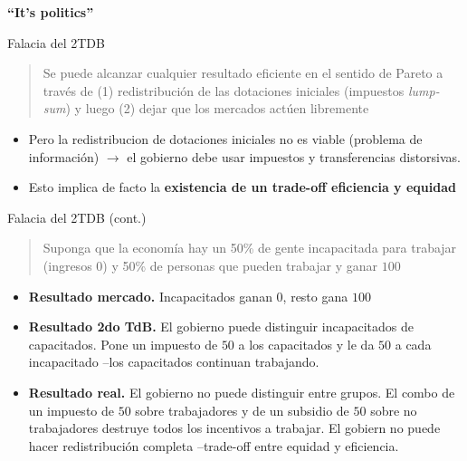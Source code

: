 \documentclass[
  ignorenonframetext,
]{beamer}
\providecommand{\tightlist}{%
  \setlength{\itemsep}{0pt}\setlength{\parskip}{0pt}}\usepackage{longtable,booktabs,array}
\begin{document}
\begin{frame}{\textbf{``It's politics''}}
\begin{block}{Falacia del 2TDB}
\protect\hypertarget{falacia-del-2tdb}{}
\begin{quote}
Se puede alcanzar cualquier resultado eficiente en el sentido de Pareto
a través de (1) redistribución de las dotaciones iniciales (impuestos
\emph{lump-sum}) y luego (2) dejar que los mercados actúen libremente
\end{quote}

\begin{itemize}
\tightlist
\item
  Pero la redistribucion de dotaciones iniciales no es viable (problema
  de información) \(\longrightarrow\) el gobierno debe usar impuestos y
  transferencias distorsivas.
\item
  Esto implica de facto la \textbf{existencia de un trade-off eficiencia
  y equidad}
\end{itemize}
\end{block}

\begin{block}{Falacia del 2TDB (cont.)}
\protect\hypertarget{falacia-del-2tdb-cont.}{}
\begin{quote}
Suponga que la economía hay un 50\% de gente incapacitada para trabajar
(ingresos \(0\)) y 50\% de personas que pueden trabajar y ganar \(100\)
\end{quote}

\begin{itemize}
\tightlist
\item
  \textbf{Resultado mercado.} Incapacitados ganan \(0\), resto gana
  \(100\)
\item
  \textbf{Resultado 2do TdB.} El gobierno puede distinguir incapacitados
  de capacitados. Pone un impuesto de \(50\) a los capacitados y le da
  \(50\) a cada incapacitado --los capacitados continuan trabajando.
\item
  \textbf{Resultado real.} El gobierno no puede distinguir entre grupos.
  El combo de un impuesto de \(50\) sobre trabajadores y de un subsidio
  de \(50\) sobre no trabajadores destruye todos los incentivos a
  trabajar. El gobiern no puede hacer redistribución completa
  --trade-off entre equidad y eficiencia.
\end{itemize}
\end{block}
\end{frame}
\end{document}
